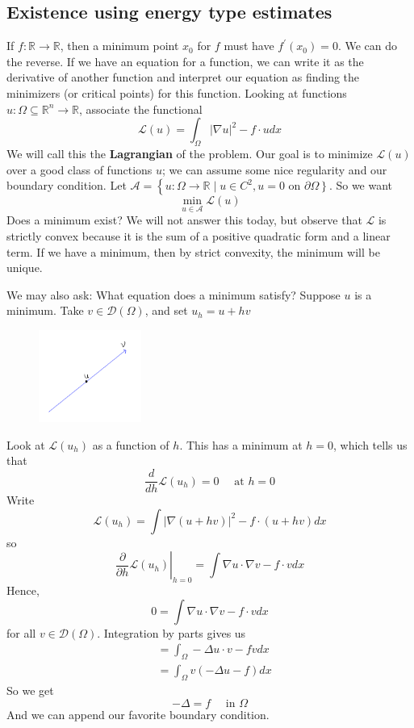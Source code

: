 \subsection{Existence using energy type estimates}
If $f: \mathbb{R} \rightarrow \mathbb{R}$, then a minimum point $x_{0}$ for $f$ must have $f^{\prime}\left(x_{0}\right)=0 .$ We can do the reverse. If we have an equation for a function, we can write it as the derivative of another function and interpret our equation as finding the minimizers (or critical points) for this function.
Looking at functions $u: \Omega \subseteq \mathbb{R}^{n} \rightarrow \mathbb{R}$, associate the functional
$$
\mathcal{L}(u)=\int_{\Omega}|\nabla u|^{2}-f \cdot u d x
$$
We will call this the \textbf{Lagrangian} of the problem. Our goal is to minimize $\mathcal{L}(u)$ over a good class of functions $u$; we can assume some nice regularity and our boundary condition. Let $\mathcal{A}=\left\{u: \Omega \rightarrow \mathbb{R} \mid u \in C^{2}, u=0\right.$ on $\left.\partial \Omega\right\}$. So we want
$$
\min _{u \in \mathcal{A}} \mathcal{L}(u)
$$
Does a minimum exist? We will not answer this today, but observe that $\mathcal{L}$ is strictly convex because it is the sum of a positive quadratic form and a linear term. If we have a minimum, then by strict convexity, the minimum will be unique.

We may also ask: What equation does a minimum satisfy? Suppose $u$ is a minimum. Take $v \in \mathcal{D}(\Omega)$, and set $u_{h}=u+h v$

\begin{figure}[H]
    \centering
    \includegraphics[width=0.3\textwidth]{Pics/23-2.png}
\end{figure}
Look at $\mathcal{L}\left(u_{h}\right)$ as a function of $h$. This has a minimum at $h=0$, which tells us that
$$
\frac{d}{d h} \mathcal{L}\left(u_{h}\right)=0 \quad \text { at } h=0
$$
Write
$$
\mathcal{L}\left(u_{h}\right)=\int|\nabla(u+h v)|^{2}-f \cdot(u+h v) d x
$$
so
$$
\left.\frac{\partial}{\partial h} \mathcal{L}\left(u_{h}\right)\right|_{h=0}=\int \nabla u \cdot \nabla v-f \cdot v d x
$$
Hence,
$$
0=\int \nabla u \cdot \nabla v-f \cdot v d x
$$
for all $v \in \mathcal{D}(\Omega)$. Integration by parts gives us
$$
\begin{aligned}
&=\int_{\Omega}-\Delta u \cdot v-f v d x \\
&=\int_{\Omega} v(-\Delta u-f) d x
\end{aligned}
$$
So we get
$$
-\Delta=f \quad \text { in } \Omega
$$
And we can append our favorite boundary condition.

